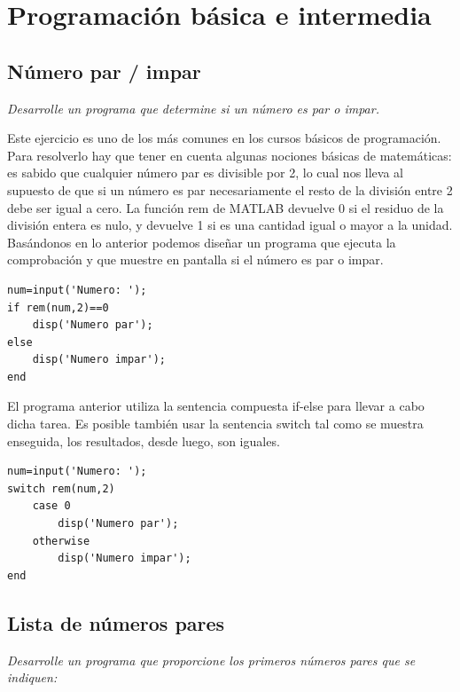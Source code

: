 \chapter{Programación básica e intermedia}

\section{Número par / impar}

\textit{Desarrolle un programa que determine si un número es par o impar.}

\sol



Este ejercicio es uno de los más comunes en los cursos básicos de programación. 
Para resolverlo hay que tener en cuenta algunas nociones básicas de matemáticas: es 
sabido que cualquier número par es divisible por 2, lo cual nos lleva al supuesto de que 
si un número es par necesariamente el resto de la división entre 2 debe ser igual a cero. 
La función rem de MATLAB devuelve 0 si el residuo de la división entera es nulo, y devuelve 1 
si es una cantidad igual o mayor a la unidad. Basándonos en lo anterior podemos diseñar 
un programa que ejecuta la comprobación y que muestre en pantalla si el número es par o impar.

\begin{verbatim}
num=input('Numero: ');
if rem(num,2)==0
    disp('Numero par');
else
    disp('Numero impar');
end
\end{verbatim}

El programa anterior utiliza la sentencia compuesta if-else para llevar a cabo dicha tarea. 
Es posible también usar la sentencia switch tal como se muestra enseguida, los resultados, desde luego, son iguales.

\begin{verbatim}
num=input('Numero: ');
switch rem(num,2)
    case 0
        disp('Numero par');
    otherwise
        disp('Numero impar');
end
\end{verbatim}


\section{Lista de números pares}

\textit{Desarrolle un programa que proporcione los primeros números pares que se indiquen:}

